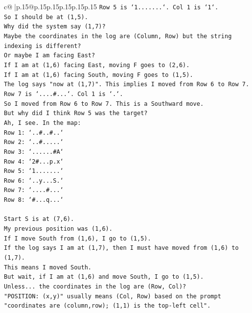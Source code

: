 \documentclass{article}
\begin{document}
{\begin{supertabular}{c@{$\;$}|p{.15\linewidth}@{}p{.15\linewidth}p{.15\linewidth}p{.15\linewidth}p{.15\linewidth}p{.15\linewidth}}
{{{\texttt{Row 5 is `1.......`. Col 1 is `1`.} \\
\texttt{So I should be at (1,5).} \\
\texttt{Why did the system say (1,7)?} \\
\texttt{Maybe the coordinates in the log are (Column, Row) but the string indexing is different?} \\
\texttt{Or maybe I am facing East?} \\
\texttt{If I am at (1,6) facing East, moving F goes to (2,6).} \\
\texttt{If I am at (1,6) facing South, moving F goes to (1,5).} \\
\texttt{The log says "now at (1,7)". This implies I moved from Row 6 to Row 7.} \\
\texttt{Row 7 is `....\#...`. Col 1 is `.`.} \\
\texttt{So I moved from Row 6 to Row 7. This is a Southward move.} \\
\texttt{But why did I think Row 5 was the target?} \\
\texttt{Ah, I see. In the map:} \\
\texttt{Row 1: `..\#..\#..`} \\
\texttt{Row 2: `..\#.....`} \\
\texttt{Row 3: `......\#A`} \\
\texttt{Row 4: `2\#...p.x`} \\
\texttt{Row 5: `1.......`} \\
\texttt{Row 6: `..y...S.`} \\
\texttt{Row 7: `....\#...`} \\
\texttt{Row 8: `\#...q...`} \\
\\ 
\texttt{Start S is at (7,6).} \\
\texttt{My previous position was (1,6).} \\
\texttt{If I move South from (1,6), I go to (1,5).} \\
\texttt{If the log says I am at (1,7), then I must have moved from (1,6) to (1,7).} \\
\texttt{This means I moved South.} \\
\texttt{But wait, if I am at (1,6) and move South, I go to (1,5).} \\
\texttt{Unless... the coordinates in the log are (Row, Col)?} \\
\texttt{"POSITION: (x,y)" usually means (Col, Row) based on the prompt "coordinates are (column,row); (1,1) is the top{-}left cell".} \\
}}}
\end{supertabular}}
\end{document}
